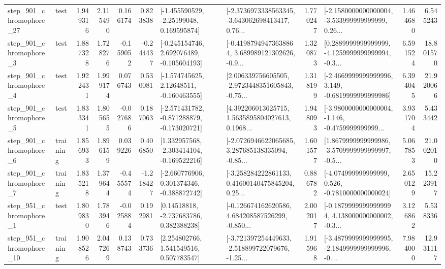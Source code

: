 \begin{tabular}{llrrrrllrlrr}
  step\_901\_chromophore\_27 &      test &      1.949316 &    2.115490 &      0.166174 &  0.823838 &    [-1.455590529, -2.25199048, 0.169595874] &  [-2.3736973338563345, -3.643062698413417, 0.76... &       1.770247 &  [-2.1580000000000004, -3.533999999999999, 0.26... &            1.464680 &          6.545243 \\
   step\_901\_chromophore\_3 &      test &      1.887328 &    1.728276 &     -0.159052 & -0.244437 &   [-0.245154746, 2.692076489, -0.105604193] &  [-0.41987949473638864, 3.689989121302626, -0.9... &       1.320873 &  [0.2889999999999999, -4.1259999999999994, -0.3... &            6.591524 &         18.801570 \\
   step\_901\_chromophore\_4 &      test &      1.922431 &    1.999174 &      0.076743 &  0.530081 &    [-1.574745625, 2.12648511, -0.160463555] &  [2.006339756605505, -2.9723448351605843, -0.75... &       1.318199 &  [-2.4669999999999996, 3.149, -0.6819999999999986] &            6.394045 &         21.920066 \\
   step\_901\_chromophore\_5 &      test &      1.833341 &    1.805655 &     -0.027686 &  0.187063 &  [-2.571431782, -0.871288879, -0.173020721] &  [4.392206013625715, 1.5635895804027613, 0.1968... &       1.948093 &  [-3.9800000000000004, -1.146, -0.4759999999999... &            3.931704 &          5.433442 \\
   step\_901\_chromophore\_6 &  training &      1.856933 &    1.896159 &      0.039226 &  0.406850 &   [1.332957568, -2.303414104, -0.169522216] &  [-2.0726946622065685, 3.287685138335094, -0.85... &       1.601577 &  [1.8679999999999986, -3.5709999999999997, -0.5... &            5.067853 &         21.002010 \\
   step\_901\_chromophore\_7 &  training &      1.835218 &    1.379644 &     -0.455574 & -1.218427 &   [-2.660776906, 0.301374346, -0.388872742] &  [-3.258284222861133, 0.41600140475845204, 0.25... &       0.886782 &   [-4.074999999999999, 0.526, -0.7810000000000024] &            2.650129 &         15.223917 \\
   step\_951\_chromophore\_1 &      test &      1.809830 &    1.783946 &     -0.025884 &  0.192981 &     [0.14518818, -2.737683786, 0.382388238] &  [-0.126674162620586, 4.684208587526299, -0.850... &       2.002017 &  [-0.18799999999999994, 4.138000000000002, -0.3... &            3.126862 &          5.538336 \\
  step\_951\_chromophore\_10 &  training &      1.908526 &    2.047269 &      0.138743 &  0.733736 &     [2.254802766, 1.541549516, 0.507783547] &  [-3.721397254449633, -2.518899722079676, -1.25... &       1.915968 &  [-3.4879999999999995, -2.1849999999999996, -0.... &            7.984000 &         12.931117 \\

\end{tabular}

